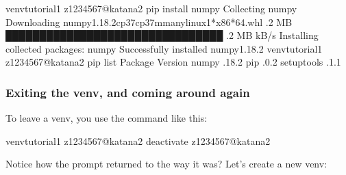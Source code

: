 \documentclass[letterpaper,10pt,english]{sphinxmanual}
\begin{document}
\begin{sphinxVerbatim}[commandchars=\\\{\}]
venv\PYGZhy{}tutorial\PYGZhy{}1 \PYG{o}{[}z1234567@katana2 \PYGZti{}\PYG{o}{]}\PYGZdl{} pip install numpy
Collecting numpy
  Downloading numpy\PYGZhy{}1.18.2\PYGZhy{}cp37\PYGZhy{}cp37m\PYGZhy{}manylinux1*x86*64.whl .2 MB
     ████████████████████████████████ .2 MB  kB/s
Installing collected packages: numpy
Successfully installed numpy\PYGZhy{}1.18.2
venv\PYGZhy{}tutorial\PYGZhy{}1 \PYG{o}{[}z1234567@katana2 \PYGZti{}\PYG{o}{]}\PYGZdl{} pip list
Package    Version
\PYGZhy{}\PYGZhy{}\PYGZhy{}\PYGZhy{}\PYGZhy{}\PYGZhy{}\PYGZhy{}\PYGZhy{}\PYGZhy{}\PYGZhy{} \PYGZhy{}\PYGZhy{}\PYGZhy{}\PYGZhy{}\PYGZhy{}\PYGZhy{}\PYGZhy{}
numpy      .18.2
pip        .0.2
setuptools .1.1
\end{sphinxVerbatim}


\subsubsection{Exiting the venv, and coming around again}
\label{\detokenize{software/python-virtualenvs:exiting-the-venv-and-coming-around-again}}
To leave a venv, you use the  command like this:

\begin{sphinxVerbatim}[commandchars=\\\{\}]
venv\PYGZhy{}tutorial\PYGZhy{}1 \PYG{o}{[}z1234567@katana2 \PYGZti{}\PYG{o}{]}\PYGZdl{} deactivate
\PYG{o}{[}z1234567@katana2 \PYGZti{}\PYG{o}{]}\PYGZdl{}
\end{sphinxVerbatim}

Notice how the prompt returned to the way it was? Let’s create a new venv:
\end{document}
